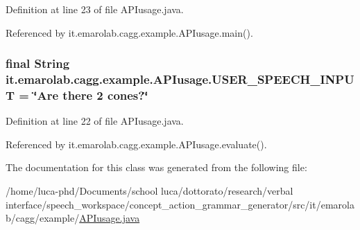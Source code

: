 Definition at line 23 of file A\-P\-Iusage.\-java.



Referenced by it.\-emarolab.\-cagg.\-example.\-A\-P\-Iusage.\-main().

\hypertarget{classit_1_1emarolab_1_1cagg_1_1example_1_1APIusage_ab19ca73626b1011aa6904a30f866f470}{
\subsubsection[{U\-S\-E\-R\-\_\-\-S\-P\-E\-E\-C\-H\-\_\-\-I\-N\-P\-U\-T}]{\setlength{\rightskip}{0pt plus 5cm}final String it.\-emarolab.\-cagg.\-example.\-A\-P\-Iusage.\-U\-S\-E\-R\-\_\-\-S\-P\-E\-E\-C\-H\-\_\-\-I\-N\-P\-U\-T = \char`\"{}Are there 2 cones?\char`\"{}\hspace{0.3cm}{\ttfamily [static]}}}\label{classit_1_1emarolab_1_1cagg_1_1example_1_1APIusage_ab19ca73626b1011aa6904a30f866f470}


Definition at line 22 of file A\-P\-Iusage.\-java.



Referenced by it.\-emarolab.\-cagg.\-example.\-A\-P\-Iusage.\-evaluate().



The documentation for this class was generated from the following file\-:\begin{DoxyCompactItemize}
\item 
/home/luca-\/phd/\-Documents/school luca/dottorato/research/verbal interface/speech\-\_\-workspace/concept\-\_\-action\-\_\-grammar\-\_\-generator/src/it/emarolab/cagg/example/\hyperlink{APIusage_8java}{A\-P\-Iusage.\-java}\end{DoxyCompactItemize}
